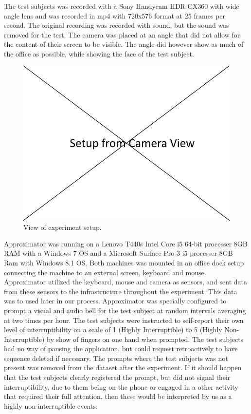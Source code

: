 \documentclass{sigchi}
\begin{document}
The test subjects was recorded with a Sony Handycam HDR-CX360 with wide angle lens and was recorded in mp4 with 720x576 format at 25 frames per second.
The original recording was recorded with sound, but the sound was removed for the test.
The camera was placed at an angle that did not allow for the content of their screen to be visible.
The angle did however show as much of the office as possible, while showing the face of the test subject.

\begin{figure}
  \centering
  \includegraphics[width=\columnwidth]{figures/experiment_setup.png}
  \caption{View of experiment setup.}
  \label{fig:experiment}
\end{figure}

Approximator was running on a Lenovo T440s Intel Core i5 64-bit processer 8GB RAM with a Windows 7 OS and a Microsoft Surface Pro 3 i5 processer 8GB Ram with Windows 8.1 OS.
Both machines was mounted in an office dock setup connecting the machine to an external screen, keyboard and mouse.
Approximator utilized the keyboard, mouse and camera as sensors, and sent data from these sensors to the infrastructure throughout the experiment.
This data was to used later in our process.
Approximator was specially configured to prompt a visual and audio bell for the test subject at random intervals averaging at two times per hour.
The test subjects were instructed to self-report their own level of interruptibility on a scale of 1 (Highly Interruptible) to 5 (Highly Non-Interruptible) by show of fingers on one hand when prompted.
The test subjects had no way of pausing the application, but could request retroactively to have sequence deleted if necessary.
The prompts where the test subjects was not present was removed from the dataset after the experiment.
If it should happen that the test subjects clearly registered the prompt, but did not signal their interruptibility, due to them being on the phone or engaged in a other activity that required their full attention, then these would be interpreted by us as a highly non-interruptible events.
\end{document}

